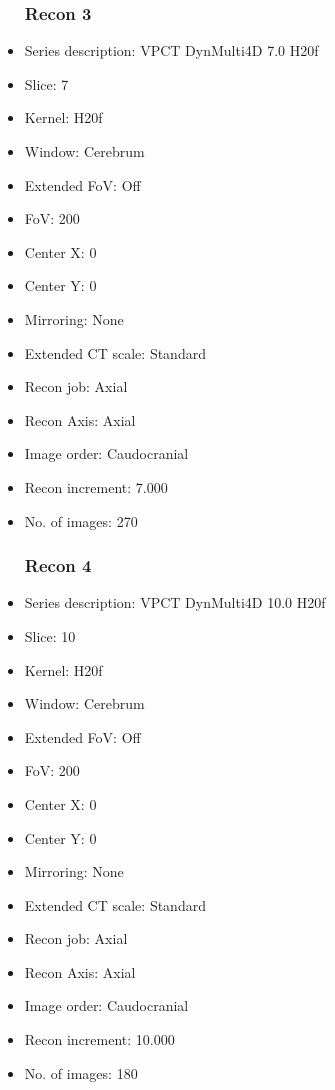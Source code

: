 \documentclass[12pt]{article}
\begin{document}
\begin{itemize}
\subsubsection{Recon 3}
\item Series description: VPCT DynMulti4D 7.0 H20f
\item Slice: 7
\item Kernel: H20f
\item Window: Cerebrum
\item Extended FoV: Off
\item FoV: 200
\item Center X: 0
\item Center Y: 0
\item Mirroring: None
\item Extended CT scale: Standard
\item Recon job: Axial
\item Recon Axis: Axial
\item Image order: Caudocranial
\item Recon increment: 7.000
\item No. of images: 270
\subsubsection{Recon 4}
\item Series description: VPCT DynMulti4D 10.0 H20f
\item Slice: 10
\item Kernel: H20f
\item Window: Cerebrum
\item Extended FoV: Off
\item FoV: 200
\item Center X: 0
\item Center Y: 0
\item Mirroring: None
\item Extended CT scale: Standard
\item Recon job: Axial
\item Recon Axis: Axial
\item Image order: Caudocranial
\item Recon increment: 10.000
\item No. of images: 180
\end{itemize}
\end{document}
